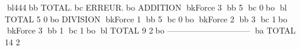 bl444bb           TOTAL.bc      ERREUR.bo
ADDITION
bkForce      3     bb  5	bc        0bo
bl TOTAL             5	        0bo
DIVISION
bkForce      1     bb  5	bc        0bo
bkForce      2     bb  3	bc        1bo
bkForce      3     bb  1	bc        1bo
bl TOTAL             9	        2bo
------------------------------
ba TOTAL            14	        2
